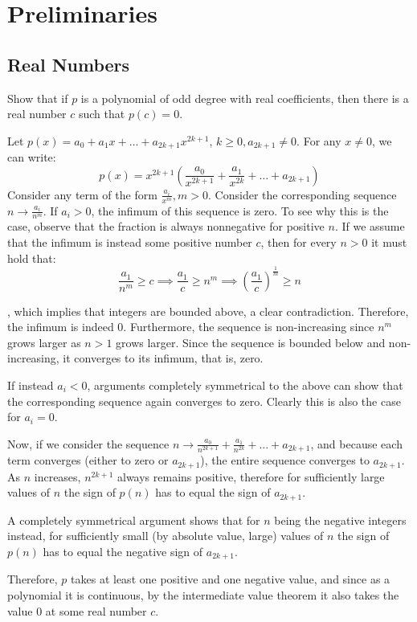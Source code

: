 \chapter{Preliminaries}

\setcounter{section}{4} 
\section{Real Numbers}

\begin{exercise}{1}
    Show that if $p$ is a polynomial of odd degree with real coefficients, then there is a real number $c$ such that $p(c) = 0$.
\end{exercise}

\begin{solution}

    Let $p(x) = a_0 + a_1x+ \ldots + a_{2k+1}x^{2k+1}$, $k \geq 0, a_{2k+1} \neq 0$. For any $x \neq 0$, we can write:
    $$p(x) = x^{2k+1}(\frac{a_0}{x^{2k+1}} + \frac{a_1}{x^{2k}} + \ldots + a_{2k+1})$$
    Consider any term of the form $\frac{a_i}{x^{m}}, m > 0$. Consider the corresponding sequence $n \rightarrow \frac{a_i}{n^m}$. If $a_i > 0$, the infimum of this sequence is zero. To see why this is the case, observe that the fraction is always nonnegative for positive $n$. If we assume that the infimum is instead some positive number $c$, then for every $n > 0$ it must hold that:
    $$\frac{a_1}{n^m} \geq  c \implies \frac{a_1}{c} \geq n^m \implies (\frac{a_1}{c})^\frac{1}{m} \geq n$$

    , which implies that integers are bounded above, a clear contradiction. Therefore, the infimum is indeed 0. Furthermore, the sequence is non-increasing since $n^m$ grows larger as $n >1$ grows larger. Since the sequence is bounded below and non-increasing, it converges to its infimum, that is, zero.

    If instead $a_i < 0$, arguments completely symmetrical to the above can show that the corresponding sequence again converges to zero. Clearly this is also the case for $a_i = 0$.

    Now, if we consider the sequence $n \rightarrow \frac{a_0}{n^{2k+1}} + \frac{a_1}{n^{2k}} + \ldots + a_{2k+1}$, and because each term converges (either to zero or $a_{2k+1}$), the entire sequence converges to $a_{2k+1}$. As $n$ increases, $n^{2k+1}$ always remains positive, therefore for sufficiently large values of $n$ the sign of $p(n)$ has to equal the sign of $a_{2k+1}$.

    A completely symmetrical argument shows that for $n$ being the negative integers instead, for sufficiently small (by absolute value, large) values of $n$ the sign of $p(n)$ has to equal the negative sign of $a_{2k+1}$. 
    
    Therefore, $p$ takes at least one positive and one negative value, and since as a polynomial it is continuous, by the intermediate value theorem it also takes the value 0 at some real number $c$.

\end{solution}

